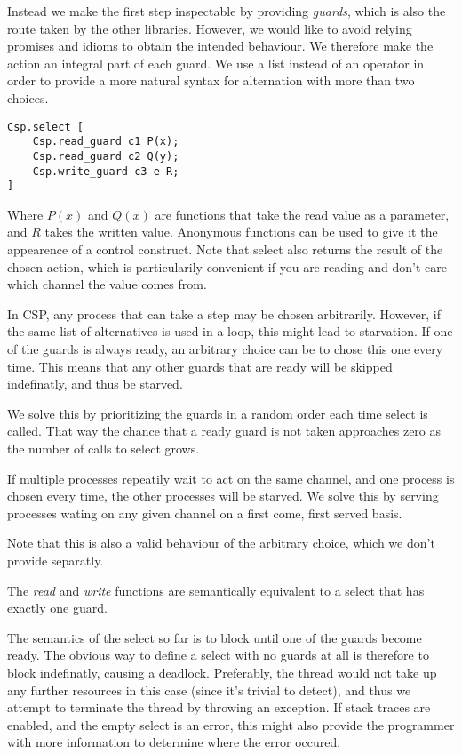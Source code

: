 \documentclass[a4paper,12pt]{article}
\begin{document}
Instead we make the first step inspectable by providing \emph{guards}, which is also the route taken by
the other libraries. However, we would like to avoid relying promises and idioms to obtain the 
intended behaviour. We therefore make the action an integral part of each guard. We use a list instead
of an operator in order to provide a more natural syntax for alternation with more than two choices.

\begin{verbatim}
Csp.select [
    Csp.read_guard c1 P(x);
    Csp.read_guard c2 Q(y);
    Csp.write_guard c3 e R;
]
\end{verbatim}
Where $P(x)$ and $Q(x)$ are functions that take the read value as a parameter, and $R$ takes the written 
value. Anonymous functions can be used to give it the appearence of a control construct. Note that select 
also returns the result of the chosen action, which is particularily convenient if you are reading and 
don't care which channel the value comes from.

In CSP, any process that can take a step may be chosen arbitrarily. However, if the same list of 
alternatives is used in a loop, this might lead to starvation. If one of the guards is always ready,
an arbitrary choice can be to chose this one every time. This means that any other guards that are 
ready will be skipped indefinatly, and thus be starved.

We solve this by prioritizing the guards in a random order each time select is called. That way the
chance that a ready guard is not taken approaches zero as the number of calls to select grows.

If multiple processes repeatily wait to act on the same channel, and one process is chosen every time,
the other processes will be starved. We solve this by serving processes wating on any given channel
on a first come, first served basis.

Note that this is also a valid behaviour of the arbitrary choice, which we don't provide separatly.

The \emph{read} and \emph{write} functions are semantically equivalent to a select that has exactly 
one guard.

The semantics of the select so far is to block until one of the guards become ready. The obvious
way to define a select with no guards at all is therefore to block indefinatly, causing a deadlock.
Preferably, the thread would not take up any further resources in this case (since it's trivial to 
detect), and thus we attempt to terminate the thread by throwing an exception. If stack traces are
enabled, and the empty select is an error, this might also provide the programmer with more information
to determine where the error occured.
\end{document}
